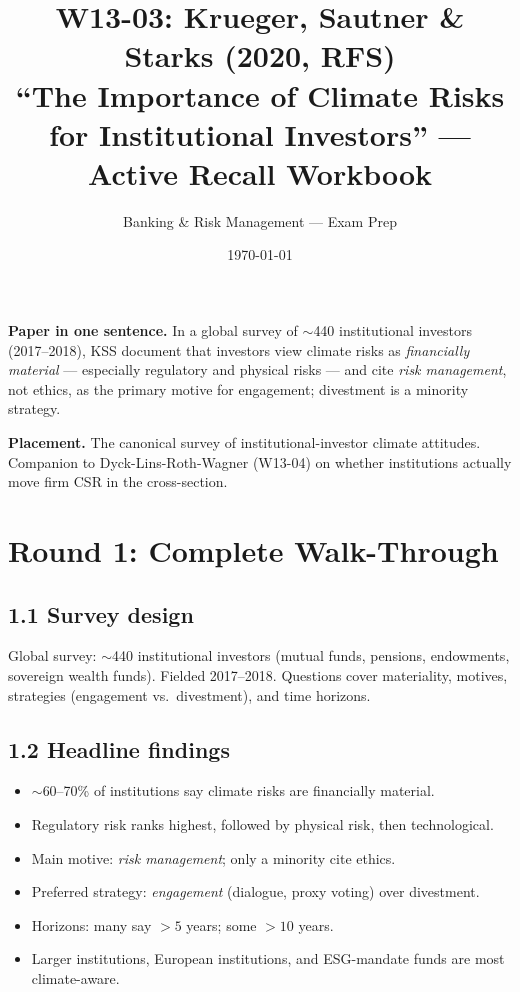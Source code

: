 \documentclass[11pt]{article}
\title{W13-03: Krueger, Sautner \& Starks (2020, RFS) \\
\large ``The Importance of Climate Risks for Institutional Investors'' --- Active Recall Workbook}
\author{Banking \& Risk Management --- Exam Prep}
\date{\today}
\begin{document}
\maketitle

\begin{keybox}
\textbf{Paper in one sentence.} In a global survey of $\sim$440 institutional investors (2017--2018), KSS document that investors view climate risks as \emph{financially material} --- especially regulatory and physical risks --- and cite \emph{risk management}, not ethics, as the primary motive for engagement; divestment is a minority strategy.

\textbf{Placement.} The canonical survey of institutional-investor climate attitudes. Companion to Dyck-Lins-Roth-Wagner (W13-04) on whether institutions actually move firm CSR in the cross-section.
\end{keybox}

\section*{Round 1: Complete Walk-Through}

\subsection*{1.1 Survey design}
Global survey: $\sim$440 institutional investors (mutual funds, pensions, endowments, sovereign wealth funds). Fielded 2017--2018. Questions cover materiality, motives, strategies (engagement vs.\ divestment), and time horizons.

\subsection*{1.2 Headline findings}
\begin{itemize}
\item $\sim$60--70\% of institutions say climate risks are financially material.
\item Regulatory risk ranks highest, followed by physical risk, then technological.
\item Main motive: \emph{risk management}; only a minority cite ethics.
\item Preferred strategy: \emph{engagement} (dialogue, proxy voting) over divestment.
\item Horizons: many say $>5$ years; some $>10$ years.
\item Larger institutions, European institutions, and ESG-mandate funds are most climate-aware.
\end{itemize}
\end{document}
